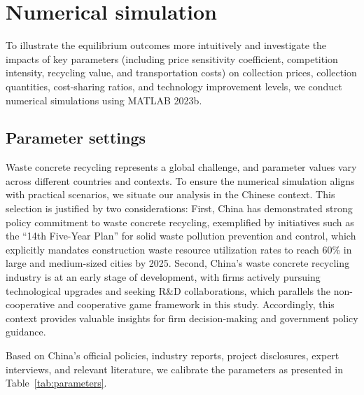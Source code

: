\documentclass[authoryear,preprint,review,times,10pt]{elsarticle}
\begin{document}
\section{Numerical simulation}
To illustrate the equilibrium outcomes more intuitively and investigate the impacts of key parameters (including price sensitivity coefficient, competition intensity, recycling value, and transportation costs) on collection prices, collection quantities, cost-sharing ratios, and technology improvement levels, we conduct numerical simulations using MATLAB 2023b.

\subsection{Parameter settings}
Waste concrete recycling represents a global challenge, and parameter values vary across different countries and contexts. To ensure the numerical simulation aligns with practical scenarios, we situate our analysis in the Chinese context. This selection is justified by two considerations: First, China has demonstrated strong policy commitment to waste concrete recycling, exemplified by initiatives such as the ``14th Five-Year Plan'' for solid waste pollution prevention and control, which explicitly mandates construction waste resource utilization rates to reach 60\% in large and medium-sized cities by 2025. Second, China's waste concrete recycling industry is at an early stage of development, with firms actively pursuing technological upgrades and seeking R\&D collaborations, which parallels the non-cooperative and cooperative game framework in this study. Accordingly, this context provides valuable insights for firm decision-making and government policy guidance.

Based on China's official policies, industry reports, project disclosures, expert interviews, and relevant literature, we calibrate the parameters as presented in Table~\ref{tab:parameters}.
\end{document}
